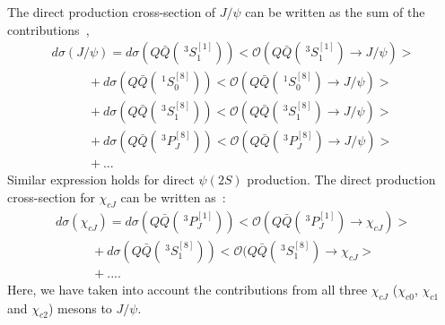 \documentclass{iopart}
\def  \bea  {\begin{eqnarray}}
\def  \eea  {\end{eqnarray}}
\def  \nn   {\nonumber}
\begin{document}

The direct production cross-section of $J/\psi$ can be written as the sum of the contributions~\cite{prd53,prd53a}, 
\bea
d\sigma(J/\psi) = d\sigma(Q\bar Q(~^3S_1^{[1]}))<\mathcal{O}(Q\bar Q(~^3S_1^{[1]})\rightarrow J/\psi)>\nn\\
~~~~~~~~~~~~~+d\sigma(Q\bar Q(~^1S_0^{[8]}))<\mathcal{O}(Q\bar Q(~^1S_0^{[8]})\rightarrow J/\psi)>\nn\\
~~~~~~~~~~~~~+d\sigma(Q\bar Q(~^3S_1^{[8]}))<\mathcal{O}(Q\bar Q(~^3S_1^{[8]})\rightarrow J/\psi)>\nn\\
~~~~~~~~~~~~~+d\sigma(Q\bar Q(~^3P_J^{[8]}))<\mathcal{O}(Q\bar Q(~^3P_J^{[8]})\rightarrow J/\psi)>\nn\\
~~~~~~~~~~~~~+...
\eea
Similar expression holds for direct $\psi(2S)$ production. The direct production cross-section for $\chi_{cJ}$ can be written as~\cite{prd53}:
\bea
d\sigma(\chi_{cJ}) = d\sigma(Q\bar Q(~^3P_J^{[1]}))<\mathcal{O}(Q\bar Q(~^3P_J^{[1]})\rightarrow \chi_{cJ})>\nn\\
~~~~~~~~~~~~~+d\sigma(Q\bar Q(~^3S_1^{[8]}))<\mathcal{O}(Q\bar Q(~^3S_1^{[8]})\rightarrow \chi_{cJ}>\nn\\
~~~~~~~~~~~~~+....
\eea
Here, we have taken into account the contributions from all three $\chi_{cJ}$ ($\chi_{c0}$, $\chi_{c1}$ and $\chi_{c2}$) mesons to $J/\psi$.
\end{document}
